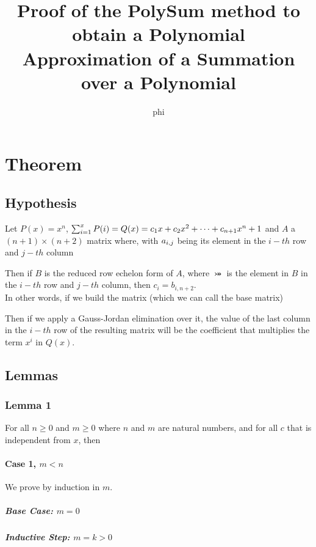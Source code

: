 \documentclass[a4paper, 10pt]{article}
\title{Proof of the PolySum method to obtain a Polynomial Approximation of a Summation over a Polynomial}
\author{phi}
\begin{document}
\allowdisplaybreaks
\maketitle

\section{Theorem}
\subsection{Hypothesis}

Let $P(x) = x^n$, $\sum_{i=1}^{x}P(i) = Q(x) = c_1x + c_2x^2 + \cdots + c_{n+1}x^n+1$ and $A$ a $(n+1) \times (n+2)$ matrix where, with $a_{i,j}$ being its element in the $i-th$ row and $j-th$ column

\aijDef

Then if $B$ is the reduced row echelon form of $A$, where $\bij$ is the element in $B$ in the $i-th$ row  and $j-th$ column, then $c_i = b_{i,n+2}$.\\

In other words, if we build the matrix (which we can call the base matrix)

\AMatrix

Then if we apply a Gauss-Jordan elimination over it, the value of the last column in the $i-th$ row of the resulting matrix will be the coefficient that multiplies the term $x^i$ in $Q(x)$.

\subsection{Lemmas}
\subsubsection{Lemma 1}

For all $n \geq 0$ and $m \geq 0$ where $n$ and $m$ are natural numbers, and for all $c$ that is independent from $x$, then
\lemmaOne

\paragraph{Case 1, $m < n$}

We prove by induction in $m$.

\subparagraph{Base Case: $m = 0$}

\lemmaOneCaseOneBase

\subparagraph{Inductive Step: $m = k > 0$}
\end{document}
